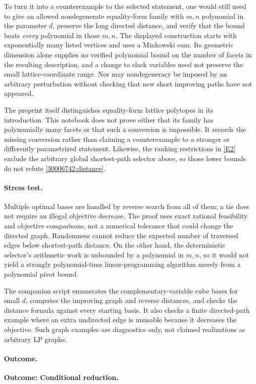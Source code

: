\documentclass[11pt,a4paper]{article}
\newcommand{\eref}[2]{\hyperlink{extra:#1:#2}{[E#2]}}
\numberwithin{equation}{section}
\begin{document}
To turn it into a counterexample to the selected statement, one would
still need to give an allowed nondegenerate equality-form family with
$m,n$ polynomial in the parameter $d$, preserve the long directed
distance, and verify that the bound beats \emph{every} polynomial in
those $m,n$.  The displayed construction starts with exponentially
many listed vertices and uses a Minkowski sum.  Its geometric dimension
alone supplies no verified polynomial bound on the number of facets
in the resulting description, and a change to slack variables need
not preserve the small lattice-coordinate range.  Nor may
nondegeneracy be imposed by an arbitrary perturbation without checking
that new short improving paths have not appeared.

The preprint itself distinguishes equality-form lattice polytopes in
its introduction.  This notebook does not prove either that its family
has polynomially many facets or that such a conversion is impossible.
It records the missing conversion rather than claiming a counterexample
to a stronger or differently parametrized statement.  Likewise, the
ranking restrictions in \eref{30006742}{2} exclude the arbitrary global
shortest-path selector above, so those lower bounds do not refute
\eqref{30006742:distance}.

\paragraph{Stress test.}
Multiple optimal bases are handled by reverse search from all of them;
a tie does not require an illegal objective decrease.  The proof uses
exact rational feasibility and objective comparisons, not a numerical
tolerance that could change the directed graph.  Randomness cannot
reduce the expected number of traversed edges below shortest-path
distance.  On the other hand, the deterministic selector's arithmetic
work is unbounded by a polynomial in $m,n$, so it would not yield a
strongly polynomial-time linear-programming algorithm merely from a
polynomial pivot bound.

The companion script enumerates the complementary-variable cube bases
for small $d$, computes the improving graph and reverse distances, and
checks the distance formula against every starting basis.  It also
checks a finite directed-path example where an extra undirected edge
is unusable because it decreases the objective.  Such graph examples
are diagnostics only, not claimed realizations as arbitrary LP graphs.

\paragraph{Outcome.}
\textbf{Outcome: Conditional reduction.}
\end{document}
